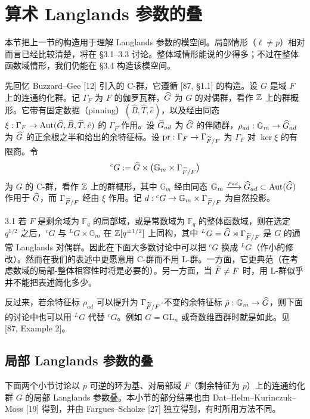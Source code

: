 \section{算术 Langlands 参数的叠}

本节把上一节的构造用于理解 Langlands 参数的模空间。局部情形（$\ell\neq p$）相对而言已经比较清楚，将在 §3.1–3.3 讨论。整体域情形能说的少得多；不过在整体函数域情形，我们仍能在 §3.4 构造该模空间。

先回忆 Buzzard–Gee [12] 引入的 C-群，它遵循 [87, §1.1] 的构造。设 $G$ 是域 $F$ 上的连通约化群。记 $\Gamma_F$ 为 $F$ 的伽罗瓦群，$\widehat{G}$ 为 $G$ 的对偶群，看作 $\mathbb{Z}$ 上的群概形。它带有固定数据（pinning）$(\widehat{B},\widehat{T},\hat{e})$，以及经由同态 $\xi:\Gamma_F\to\operatorname{Aut}(\widehat{G},\widehat{B},\widehat{T},\hat{e})$ 的 $\Gamma_F$-作用。设 $\widehat{G}_{ad}$ 为 $\widehat{G}$ 的伴随群，$\rho_{ad}:\mathbb G_m\to\widehat{G}_{ad}$ 为 $\widehat{G}$ 的正余根之半和给出的余特征标。设 $\mathrm{pr}:\Gamma_F\to\Gamma_{\widetilde F/F}$ 为 $\Gamma_F$ 对 $\ker\xi$ 的有限商。令
\[
{}^cG:=\widehat{G}\rtimes\big(\mathbb G_m\times\Gamma_{\widetilde F/F}\big)
\]
为 $G$ 的 C-群，看作 $\mathbb{Z}$ 上的群概形，其中 $\mathbb G_m$ 经由同态 $\mathbb G_m\xrightarrow{\rho_{ad}}\widehat{G}_{ad}\subset\operatorname{Aut}(\widehat{G})$ 作用于 $\widehat{G}$，而 $\Gamma_{\widetilde F/F}$ 经由 $\xi$ 作用。记 $d:{}^cG\to\mathbb G_m\times\Gamma_{\widetilde F/F}$ 为自然投影。

\begin{rem}{3.1}
若 $F$ 是剩余域为 $\mathbb F_q$ 的局部域，或是常数域为 $\mathbb F_q$ 的整体函数域，则在选定 $q^{1/2}$ 之后，${}^cG$ 与 ${}^LG\times\mathbb G_m$ 在 $\mathbb{Z}[q^{\pm1/2}]$ 上同构，其中 ${}^LG=\widehat{G}\rtimes\Gamma_{\widetilde F/F}$ 是 $G$ 的通常 Langlands 对偶群。因此在下面大多数讨论中可以把 ${}^cG$ 换成 ${}^LG$（作小的修改）。然而在我们的表述中更愿意用 C-群而不用 L-群。一方面，它更典范（在考虑数域的局部-整体相容性时将是必要的）。另一方面，当 $\widetilde F\neq F$ 时，用 L-群似乎并不能把表述简化多少。
\end{rem}

反过来，若余特征标 $\rho_{ad}$ 可以提升为 $\Gamma_{\widetilde F/F}$-不变的余特征标 $\tilde\rho:\mathbb G_m\to\widehat{G}$，则下面的讨论中也可以用 ${}^LG$ 代替 ${}^cG$。例如 $G=\mathrm{GL}_n$ 或奇数维酉群时就是如此。见 [87, Example 2]。

\subsection{局部 Langlands 参数的叠}

下面两个小节讨论以 $p$ 可逆的环为基、对局部域 $F$（剩余特征为 $p$）上的连通约化群 $G$ 的局部 Langlands 参数叠。本小节的部分结果也由 Dat–Helm–Kurinczuk–Moss [19] 得到，并由 Fargues–Scholze [27] 独立得到，有时所用方法不同。


